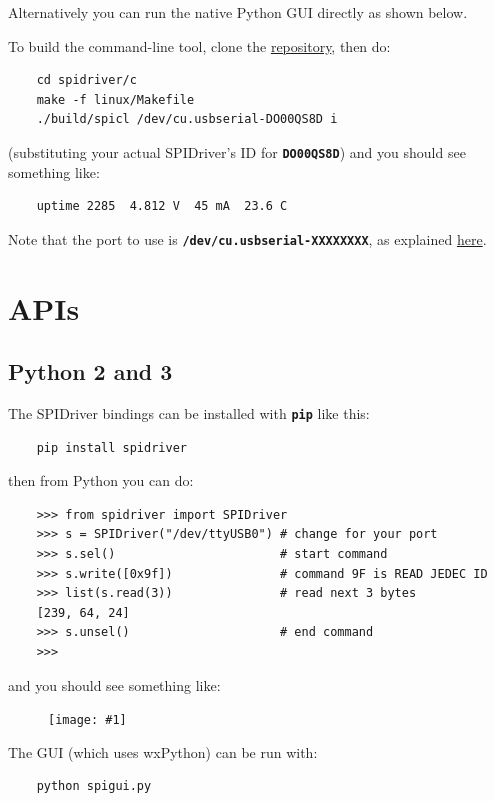 \documentclass{article}
\newcommand{\png}[1]{
\begin{figure}[H]
\begin{center}
\texttt{[image: \#1]}
\end{center}
\end{figure}
}
\newcommand{\mach}[1]{\texttt{\textbf{#1}}}
\begin{document}
Alternatively you can run the native Python GUI directly as shown below.

\index{spicl@\mach{spicl}}
To  build the command-line tool, clone the
\href{https://github.com/jamesbowman/spidriver}{repository}, then do:

\begin{lstlisting}
    cd spidriver/c
    make -f linux/Makefile
    ./build/spicl /dev/cu.usbserial-DO00QS8D i
\end{lstlisting}

(substituting your actual SPIDriver's ID for \mach{DO00QS8D})
and you should see something like:
\begin{lstlisting}
    uptime 2285  4.812 V  45 mA  23.6 C
\end{lstlisting}

Note that the port to use is \mach{/dev/cu.usbserial-XXXXXXXX}, as explained
\href{https://pbxbook.com/other/mac-tty.html}{here}.

\section{APIs}
\subsection{Python 2 and 3}

The SPIDriver bindings can be installed with \mach{pip} like this:

\begin{lstlisting}
    pip install spidriver
\end{lstlisting}

then from Python you can do:

\begin{lstlisting}
    >>> from spidriver import SPIDriver
    >>> s = SPIDriver("/dev/ttyUSB0") # change for your port
    >>> s.sel()                       # start command
    >>> s.write([0x9f])               # command 9F is READ JEDEC ID 
    >>> list(s.read(3))               # read next 3 bytes
    [239, 64, 24]
    >>> s.unsel()                     # end command
    >>>
\end{lstlisting}

and you should see something like:

\png{img/spidriver/spidriver-flash}

The GUI (which uses wxPython) can be run with:

\begin{lstlisting}
    python spigui.py
\end{lstlisting}
\end{document}
